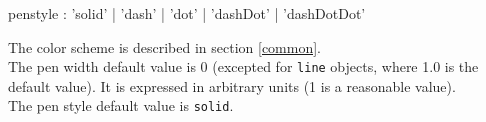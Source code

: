 \documentclass[a4paper,twoside]{report}
\newcommand{\OSC}[1]		{\texttt{#1}}
\begin{document}
\begin{rail}
penstyle : 'solid' | 'dash' | 'dot' | 'dashDot' | 'dashDotDot'
\end{rail}

%
%



The color scheme is described in section \ref{common}. \\
The pen width default value is 0 (excepted for \OSC{line} objects, where 1.0 is the default value). It is expressed in arbitrary units (1 is a reasonable value).\\
The pen style default value is \OSC{solid}.\\

\end{document}
